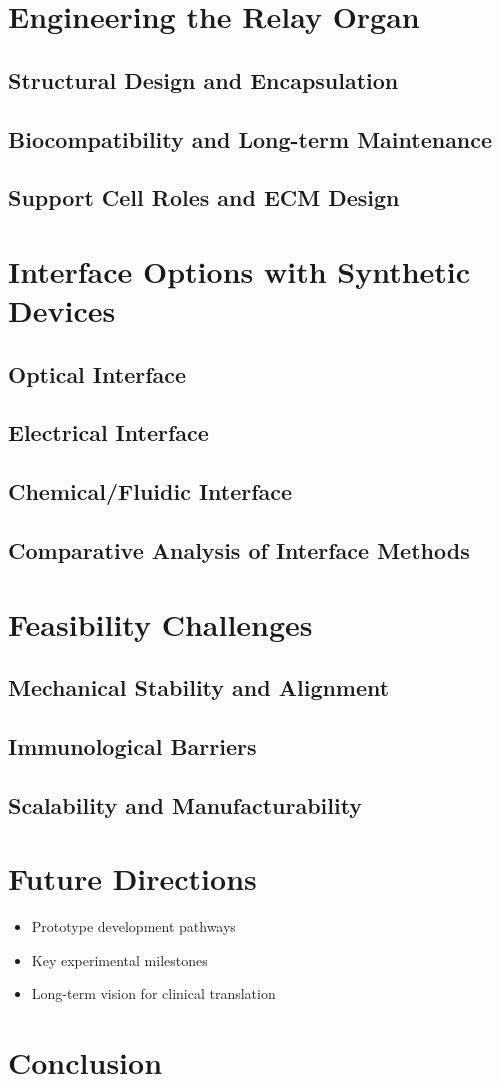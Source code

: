 \documentclass[12pt]{article}
\begin{document}
	\section{Engineering the Relay Organ}
	\subsection{Structural Design and Encapsulation}
	\subsection{Biocompatibility and Long-term Maintenance}
	\subsection{Support Cell Roles and ECM Design}
	
	\section{Interface Options with Synthetic Devices}
	\subsection{Optical Interface}
	\subsection{Electrical Interface}
	\subsection{Chemical/Fluidic Interface}
	\subsection{Comparative Analysis of Interface Methods}
	
	\section{Feasibility Challenges}
	\subsection{Mechanical Stability and Alignment}
	\subsection{Immunological Barriers}
	\subsection{Scalability and Manufacturability}
	
	\section{Future Directions}
	\begin{itemize}
		\item Prototype development pathways
		\item Key experimental milestones
		\item Long-term vision for clinical translation
	\end{itemize}
	
	\section{Conclusion}
	
	
	
	
	
	
\end{document}
